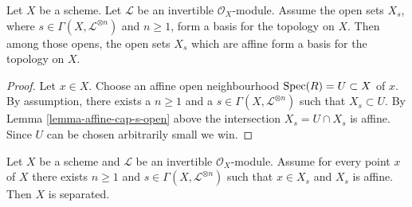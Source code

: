 \begin{lemma}
\label{lemma-affine-s-opens}
Let $X$ be a scheme. Let $\mathcal{L}$ be an invertible $\mathcal{O}_X$-module.
Assume the open sets $X_s$, where $s \in \Gamma(X, \mathcal{L}^{\otimes n})$
and $n \geq 1$, form a basis for the topology on $X$.
Then among those opens, the open sets $X_s$ which are affine
form a basis for the topology on $X$.
\end{lemma}

\begin{proof}
Let $x \in X$. Choose an affine open neighbourhood
$\mathop{\mathrm{Spec}}(R) = U \subset X$ of $x$.
By assumption, there exists
a $n \geq 1$ and a $s \in \Gamma(X, \mathcal{L}^{\otimes n})$
such that $X_s \subset U$. By Lemma \ref{lemma-affine-cap-s-open} above
the intersection $X_s = U \cap X_s$ is affine.
Since $U$ can be chosen arbitrarily small we win.
\end{proof}

\begin{lemma}
\label{lemma-affine-s-opens-cover-quasi-separated}
Let $X$ be a scheme and $\mathcal{L}$ be an invertible $\mathcal{O}_X$-module.
Assume for every point $x$ of $X$ there exists $n \geq 1$ and
$s \in \Gamma(X, \mathcal{L}^{\otimes n})$ such that
$x \in X_s$ and $X_s$ is affine. Then $X$ is separated.
\end{lemma}

